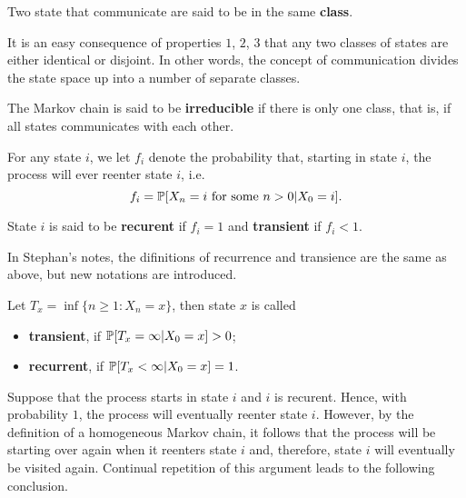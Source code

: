 \begin{definition}[Classes]
    Two state that communicate are said to be in the same \textbf{class}.
\end{definition}

\begin{remark}
    It is an easy consequence of properties $1$, $2$, $3$ that any two classes of states are either identical or disjoint. In other words, the concept of communication divides the state space up into a number of separate classes.
\end{remark}

\begin{definition}[Irreducibility]
    The Markov chain is said to be \textbf{irreducible} if there is only one class, that is, if all states communicates with each other.
\end{definition}

For any state $i$, we let $f_i$ denote the probability that, starting in state $i$, the process will ever reenter state $i$, i.e.
$$
f_i = \mathbb{P} [X_n = i \text{ for some } n > 0 | X_0 = i].
$$

\begin{definition}
    State $i$ is said to be \textbf{recurent} if $f_i = 1$ and \textbf{transient} if $f_i < 1$.
\end{definition}

In Stephan's notes, the difinitions of recurrence and transience are the same as above, but new notations are introduced. 

\begin{definition}
    Let $T_x = \inf\{n \ge 1: X_n = x\}$, then state $x$ is called 
    \begin{itemize}
        \item \textbf{transient}, if $\mathbb{P}[T_x = \infty | X_0 = x] > 0$;
        \item \textbf{recurrent}, if $\mathbb{P}[T_x < \infty | X_0 = x] = 1$.
    \end{itemize}
\end{definition}

Suppose that the process starts in state $i$ and $i$ is recurent. Hence, with probability $1$, the process will eventually reenter state $i$. However, by the definition of a homogeneous Markov chain, it follows that the process will be starting over again when it reenters state $i$ and, therefore, state $i$ will eventually be visited again. Continual repetition of this argument leads to the following conclusion.

